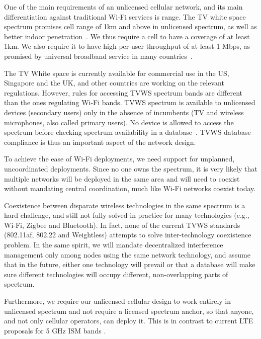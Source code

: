  One of the main requirements of an unlicensed cellular network, and its main differentiation against traditional Wi-Fi services is range. 
The TV white space spectrum promises cell range of 1km and above in unlicensed spectrum, as well as better indoor penetration~\cite{Rice_af}. 
We thus require a cell to have a coverage of at least 1km. 
We also require it to have high per-user throughput of at least 1 Mbps, as promised by universal broadband service in many countries~\cite{uni_broadband}.  

The TV White space is currently available for commercial use in the US, Singapore and the UK, and other countries are working on the relevant regulations. 
However, rules for accessing TVWS spectrum bands are different than the ones regulating Wi-Fi bands. 
TVWS spectrum is available to unlicensed devices (secondary users) only in the absence of incumbents (TV and wireless microphones, also called primary users). 
No device is allowed to access the spectrum before checking spectrum availability in a database~\cite{Rice_af}. 
TVWS database compliance is thus an important aspect of the network design.

To achieve the ease of Wi-Fi deployments, we need support for unplanned, uncoordinated deployments. Since no one owns the spectrum, it is very likely 
that multiple networks will be deployed in the same area and will need to coexist without mandating central coordination, much like Wi-Fi networks coexist today. 

Coexistence between disparate wireless technologies in the same spectrum is a hard challenge, and still not fully solved in practice for many technologies (e.g., Wi-Fi, Zigbee and Bluetooth). In fact, none of the current TVWS standards (802.11af, 802.22 and Weightless) attempts to solve inter-technology coexistence problem. 
In the same spirit, we will mandate decentralized interference management only among nodes using the same network technology, 
and assume that in the future, either one technology will prevail or that a database will make sure different technologies will occupy different, non-overlapping parts of spectrum. 

Furthermore, we require our unlicensed cellular design to work entirely in unlicensed spectrum and not require a licensed spectrum anchor, so that anyone, and not only cellular operators, can deploy it. This is in contrast to current LTE proposals for 5 GHz ISM bands \cite{lteuforum_lteu, jian2015coexistence, radisys-lte}. 

